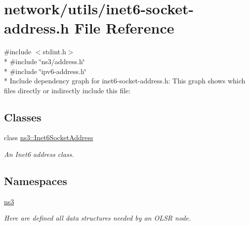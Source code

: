 \hypertarget{inet6-socket-address_8h}{}\section{network/utils/inet6-\/socket-\/address.h File Reference}
\label{inet6-socket-address_8h}
{\ttfamily \#include $<$stdint.\+h$>$}\\*
{\ttfamily \#include \char`\"{}ns3/address.\+h\char`\"{}}\\*
{\ttfamily \#include \char`\"{}ipv6-\/address.\+h\char`\"{}}\\*
Include dependency graph for inet6-\/socket-\/address.h\+:
This graph shows which files directly or indirectly include this file\+:
\subsection*{Classes}
\begin{DoxyCompactItemize}
\item 
class \hyperlink{classns3_1_1Inet6SocketAddress}{ns3\+::\+Inet6\+Socket\+Address}
\begin{DoxyCompactList}\small\item\em An Inet6 address class. \end{DoxyCompactList}\end{DoxyCompactItemize}
\subsection*{Namespaces}
\begin{DoxyCompactItemize}
\item 
 \hyperlink{namespacens3}{ns3}
\begin{DoxyCompactList}\small\item\em Here are defined all data structures needed by an O\+L\+SR node. \end{DoxyCompactList}\end{DoxyCompactItemize}
